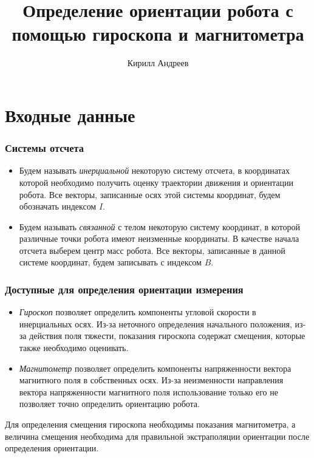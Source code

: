\documentclass[utf8]{beamer}
\title{Определение ориентации робота с помощью гироскопа и магнитометра}
\author {Кирилл Андреев}
\begin{document}
\begin{frame}
\titlepage
\end{frame}
\begin{frame}
\tableofcontents
\end{frame}

\section{Входные данные}
\begin{frame}
\frametitle{Системы отсчета}
\begin{itemize}
    \item Будем называть \emph{инерциальной} некоторую систему отсчета, в
        координатах которой необходимо получить оценку траектории движения и
        ориентации робота. Все векторы, записанные осях этой системы
        координат, будем обозначать индексом $I$.
    \item Будем называть \emph{связанной} с телом некоторую систему координат,
        в которой различные точки робота имеют неизменные координаты. В
        качестве начала отсчета выберем центр масс робота. Все векторы,
        записанные в данной системе координат, будем записывать с индексом
        $B$.
\end{itemize}
\end{frame}
\begin{frame}
\frametitle{Доступные для определения ориентации измерения}
\begin{itemize}
    \item\emph{Гироскоп} позволяет определить компоненты угловой скорости в
        инерциальных осях. Из-за неточного определения начального положения,
        из-за действия поля тяжести, показания гироскопа содержат смещения,
        которые также необходимо оценивать.
    \item\emph{Магнитометр} позволяет определить компоненты напряженности вектора
        магнитного поля в собственных осях. Из-за неизменности направления
        вектора напряженности магнитного поля использование только его не
        позволяет точно определить ориентацию робота.
\end{itemize}
Для определения смещения гироскопа необходимы показания магнитометра, а величина
смещения необходима для правильной экстраполяции ориентации после определения
ориентации.
\end{frame}
\end{document}
